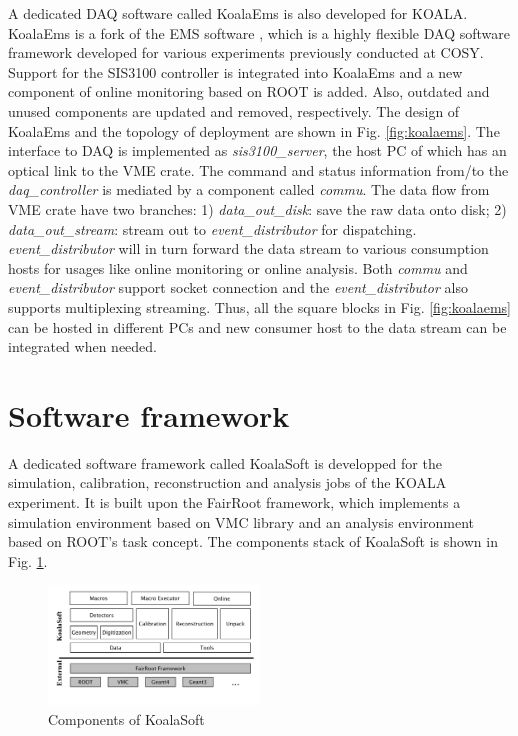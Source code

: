 \documentclass[number,5p]{elsarticle}
\begin{document}
A dedicated DAQ software called KoalaEms is also developed for KOALA.
KoalaEms is a fork of the EMS software \cite{ems}, which is a highly flexible DAQ software framework developed for various experiments previously conducted at COSY.
Support for the SIS3100 controller is integrated into KoalaEms and a new component of online monitoring based on ROOT is added.
Also, outdated and unused components are updated and removed, respectively.
The design of KoalaEms and the topology of deployment are shown in Fig. \ref{fig:koalaems}.
The interface to DAQ is implemented as \emph{sis3100\_server}, the host PC of which has an optical link to the VME crate.
The command and status information from/to the \emph{daq\_controller} is mediated by a component called \emph{commu}.
The data flow from VME crate have two branches: 1) \emph{data\_out\_disk}: save the raw data onto disk; 2) \emph{data\_out\_stream}: stream out to \emph{event\_distributor} for dispatching.
\emph{event\_distributor} will in turn forward the data stream to various consumption hosts for usages like online monitoring or online analysis.
Both \emph{commu} and \emph{event\_distributor} support socket connection and the \emph{event\_distributor} also supports multiplexing streaming.
Thus, all the square blocks in Fig. \ref{fig:koalaems} can be hosted in different PCs and new consumer host to the data stream can be integrated when needed.


\section{Software framework}
\label{sec:software}

A dedicated software framework called KoalaSoft is developped for the simulation, calibration, reconstruction and analysis jobs of the KOALA experiment.
It is built upon the FairRoot \cite{fairroot} framework, which implements a simulation environment based on VMC \cite{vmc} library and an analysis environment based on ROOT's task concept.
The components stack of KoalaSoft is shown in Fig. \ref{fig:koalasoft}.

\begin{figure}[htbp]
\centering
\includegraphics[width=0.5\textwidth]{./koalasoft_components.png}
\caption{Components of KoalaSoft}
\label{fig:koalasoft}
\end{figure}
\end{document}
